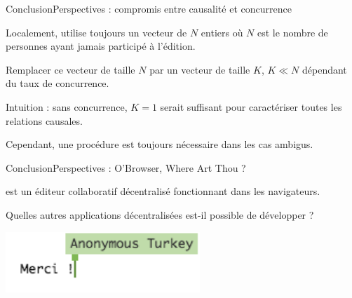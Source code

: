 \begin{frame}{Conclusion}{Perspectives : compromis entre causalité et concurrence}
  
  Localement, \CRATE utilise toujours un vecteur de $N$ entiers où $N$ est le
  nombre de personnes ayant jamais participé à l'édition.
  
  \vspace{0.5cm}

  Remplacer ce vecteur de taille $N$ par un vecteur de taille $K$, $K\ll N$
  dépendant du taux de concurrence.

  \vspace{0.5cm}

  Intuition : sans concurrence, $K=1$ serait suffisant pour caractériser toutes
  les relations causales.

  \vspace{0.5cm}

  Cependant, une procédure est toujours nécessaire dans les cas ambigus.

\end{frame}


\begin{frame}{Conclusion}{Perspectives : O'Browser, Where Art Thou ?}

  \CRATE est un éditeur collaboratif décentralisé fonctionnant dans les
  navigateurs.

  \vspace{0.25cm}

  Quelles autres applications décentralisées est-il possible de développer ?

  \vspace{0.25cm}
  

  \begin{center}
    
  \end{center}

  


\end{frame}


\begin{frame}
  
  \begin{center}
    \includegraphics[width=0.55\textwidth]{img/thanks.png}
  \end{center}

\end{frame}